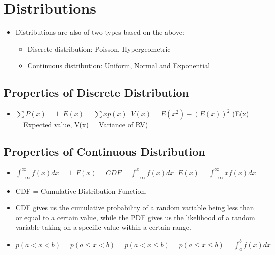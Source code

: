 \documentclass[8pt]{report}
\begin{document}
	\section{Distributions}
		\begin{itemize}
				\item Distributions are also of two types based on the above:
					\begin{itemize}
						\item Discrete distribution: Poisson, Hypergeometric
						\item Continuous distribution: Uniform, Normal and Exponential
					\end{itemize}
		\end{itemize}\hrulefill
		\subsection{Properties of Discrete Distribution}
			\begin{itemize}
				\item $\boxed{\sum P(x) = 1}\;\;\boxed{E(x)=\sum xp(x)}\;\;\boxed{V(x)=E(x^2)-(E(x))^2}$ (E(x) = Expected value, V(x) = Variance of RV)
			\end{itemize}\hrulefill
		\subsection{Properties of Continuous Distribution}
			\begin{itemize}
				\item $\boxed{\int_{-\infty}^\infty f(x)dx = 1}\;\;\boxed{F(x) = CDF = \int_{-\infty}^x f(x)dx}\;\;\boxed{E(x) = \int_{-\infty}^\infty xf(x)dx}$
				\item CDF = Cumulative Distribution Function.
				\item CDF gives us the cumulative probability of a random variable being less than or equal to a certain value, while the PDF gives us the likelihood of a random variable taking on a specific value within a certain range.
				\item $\boxed{p(a<x<b)=p(a\le x<b)=p(a<x\le b)=p(a\le x\le b)=\int_a^b f(x)dx}$
			\end{itemize}\hrulefill
\end{document}
